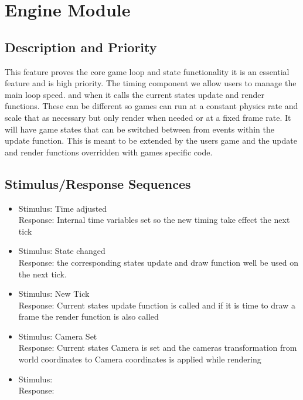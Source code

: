 \documentclass{scrreprt}
\begin{document}


\section{Engine Module}
\subsection{Description and Priority}
This feature proves the core game loop and state functionality it is an essential feature and is high priority.  The timing component we allow users to manage the main loop speed. and when it calls the current states update and render functions.  These can be different so games can run at a constant physics rate and scale that as necessary but only render when needed or at a fixed frame rate.  It will have game states that can be switched between from events within the update function.  This is meant to be extended by the users game and the update and render functions overridden with games specific code.

\subsection{Stimulus/Response Sequences}
\begin{itemize}
\item Stimulus:		Time adjusted\\
	Response: 		Internal time variables set so the new timing take effect the next tick\\
	
\item Stimulus:		State changed\\
	Response: 		the corresponding states update and draw function well be used on the next tick.\\
	
\item Stimulus:		New Tick\\
	Response: 		Current states update function is called and if it is time to draw a frame the render function is also called \\
	
\item Stimulus:		Camera Set\\
	Response: 		Current states Camera is set and the cameras transformation from world coordinates to Camera coordinates is applied while rendering \\
	
\item Stimulus:		\\
	Response: 		\\

\end{itemize}
\end{document}
